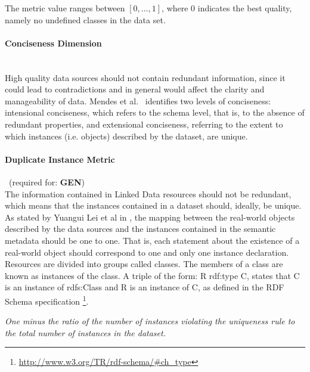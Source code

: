 The metric value ranges between $[0,\ldots,1]$, where  0 indicates the best quality, namely no undefined classes in the data set.

\paragraph{Conciseness Dimension}~\\ %
High quality data sources should not contain redundant information, since it could lead to contradictions and in general would affect the clarity and manageability of data. Mendes et al.~\cite{Mendes2012} identifies two levels of conciseness: intensional conciseness, which refers to the schema level, that is, to the absence of redundant properties, and extensional conciseness, referring to the extent to which instances (i.e. objects) described by the dataset, are unique.

\paragraph{Duplicate Instance Metric}~(required for: \textbf{GEN})~\\
The information contained in Linked Data resources should not be redundant, which means that the instances contained in a dataset should, ideally, be unique. As stated by Yuangui Lei et al in \cite{Lei2007}, the mapping between the real-world objects described by the data sources and the instances contained in the semantic metadata should be one to one. That is, each statement about the existence of a real-world object should correspond to one and only one instance declaration.
Resources are divided into groups called classes. The members of a class are known as instances of the class. A triple of the form: R rdf:type C, states that C is an instance of rdfs:Class and R is an instance of C, as defined in the RDF Schema specification \footnote{\url{http://www.w3.org/TR/rdf-schema/#ch_type}}.

\begin{mdframed}[style=metricdefinition]
\emph{One minus the ratio of the number of instances violating the uniqueness rule to the total number of instances in the dataset.}
\end{mdframed}

